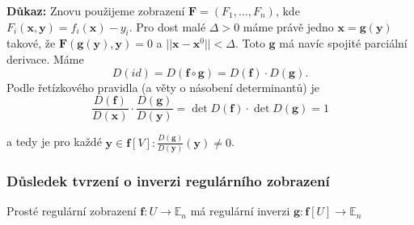 \documentclass[../main.tex]{subfiles}
\begin{document}
\vspace{5mm}
\noindent
\textbf{Důkaz:} Znovu použijeme zobrazení $\textbf{F} = (F_1,...,F_n)$, kde $F_i(\textbf{x},\textbf{y}) = f_i(\textbf{x})-y_i$. Pro dost malé 
$\Delta > 0$ máme právě jedno $\textbf{x} = \textbf{g}(\textbf{y})$ takové, že $\textbf{F}(\mathbf{g}(\textbf{y}),\textbf{y}) = 0$ a $||\textbf{x} - \textbf{x}^0|| < \Delta$.
Toto $\textbf{g}$ má navíc spojité parciální derivace. Máme
\[D(id) = D(\textbf{f}\circ\textbf{g}) = D(\textbf{f})\cdot D(\textbf{g}).\]
Podle řetízkového pravidla (a věty o násobení determinantů) je 
\[\frac{D(\textbf{f})}{D(\textbf{x})}\cdot\frac{D(\textbf{g})}{D(\textbf{y})} = \det D(\textbf{f})\cdot \det D(\textbf{g}) = 1\]

a tedy je pro každé $\textbf{y} \in \textbf{f}[V] \colon \frac{D(\textbf{g})}{D(\textbf{y})}(\textbf{y}) \neq 0$.

\subsubsection{Důsledek tvrzení o inverzi regulárního zobrazení}
\hspace{1.2mm}
\noindent
Prosté regulární zobrazení $\mathbf{f}: U \to \mathbb{E}_n$ má regulární inverzi
$\mathbf{g}: \mathbf{f}[U] \to \mathbb{E}_n$
\end{document}
